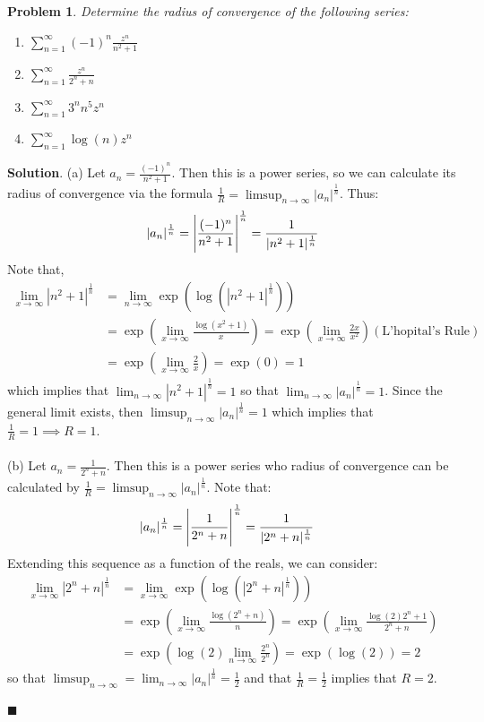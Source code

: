 \documentclass[12pt]{article}
\renewcommand{\=}[1]{\stackrel{#1}{=}} %
\newtheorem{p}{Problem}[section]
\theoremstyle{definition}
\newenvironment{s}{%
        \begin{trivlist} \item \textbf{Solution}. }{%
            \hspace*{\fill} $\blacksquare$\end{trivlist}}%
\begin{document}
\begin{p}
    Determine the radius of convergence of the following series:
    \begin{enumerate}
        \item $\sum_{n=1}^{\infty} (-1)^n\frac{z^n}{n^2+1}$
        \item $\sum_{n=1}^{\infty} \frac{z^n}{2^n+n}$
        \item $\sum_{n=1}^{\infty} 3^nn^5z^n$
        \item $\sum_{n=1}^{\infty} \log(n)z^n$
    \end{enumerate}
\end{p}
\begin{s}
    (a) Let $a_n = \frac{(-1)^n}{n^2+1}$. Then this is a power series, so we can calculate its radius of convergence via
    the formula $\frac{1}{R} = \limsup_{n\to\infty}|a_n|^{\frac{1}{n}}$. Thus:
    \begin{align*}
        |a_n|^{\frac{1}{n}} = \Bigg{|}\frac{(-1)^n}{n^2+1}\Bigg{|}^{\frac{1}{n}} = \frac{1}{|n^2+1|^{\frac{1}{n}}}
    \end{align*}
    Note that,
    \begin{align*}
        \lim_{x\to\infty} |n^2+1|^{\frac{1}{n}} &= \lim_{n\to\infty} \exp(\log(|n^2+1|^{\frac{1}{n}})) \\
        &= \exp(\lim_{x\to\infty}\frac{\log(x^2+1)}{x}) = \exp(\lim_{x\to\infty}\frac{2x}{x^2}) (\text{L'hopital's Rule})\\
        &= \exp(\lim_{x\to\infty}\frac{2}{x}) = \exp(0) = 1
    \end{align*}
    which implies that $\lim_{n\to\infty}|n^2+1|^{\frac{1}{n}} = 1$ so that $\lim_{n\to\infty}|a_n|^{\frac{1}{n}} = 1$.
    Since the general limit exists, then $\limsup_{n\to\infty}|a_n|^{\frac{1}{n}} = 1$ which implies that $\frac{1}{R} = 1
    \implies R = 1$.\\ \\

    (b) Let $a_n = \frac{1}{2^n + n}$. Then this is a power series who radius of convergence can be calculated by
    $\frac{1}{R} = \limsup_{n\to\infty}|a_n|^{\frac{1}{n}}$. Note that:
    \begin{align*}
        |a_n|^{\frac{1}{n}} &= \Bigg{|}\frac{1}{2^n+n}\Bigg{|}^{\frac{1}{n}} = \frac{1}{|2^n+n|^{\frac{1}{n}}}
    \end{align*}
    Extending this sequence as a function of the reals, we can consider:
    \begin{align*}
        \lim_{x\to\infty} |2^n+n|^{\frac{1}{n}} &= \lim_{x\to\infty} \exp(\log(|2^n+n|^{\frac{1}{n}})) \\
        &= \exp(\lim_{x\to\infty} \frac{\log(2^n+n)}{n}) = \exp(\lim_{x\to\infty} \frac{\log(2)2^n+1}{2^n+n}) \\
        &= \exp(\log(2)\lim_{n\to\infty}\frac{2^n}{2^n}) = \exp(\log(2)) = 2
    \end{align*}
    so that $\limsup_{n\to\infty} = \lim_{n\to\infty} |a_n|^{\frac{1}{n}} = \frac{1}{2}$ and that $\frac{1}{R} = \frac{1}{2}$
    implies that $R = 2$. \\ \\


\end{s}
\end{document}
